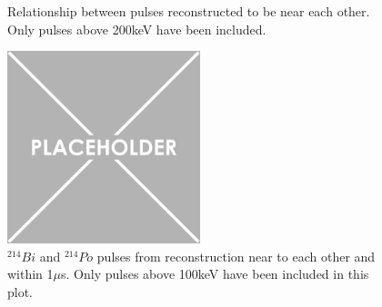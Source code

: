 
\begin{figure}[!htbp]%
\centering
{}
\caption{Relationship between pulses reconstructed to be near each other.
         Only pulses above 200keV have been included.}
\label{fig:od_bipo_alphas_2d}
\end{figure}

\begin{figure}[!htbp]
    \centering
    \includegraphics[width=0.5\textwidth]{Figures/Placeholder.png}
    \caption{${}^{214}Bi$ and ${}^{214}Po$ pulses from reconstruction near to each other and within 1$\mu$s.
             Only pulses above 100keV have been included in this plot.}
    \label{fig:od_bipo_alphas_2d_2}
\end{figure}